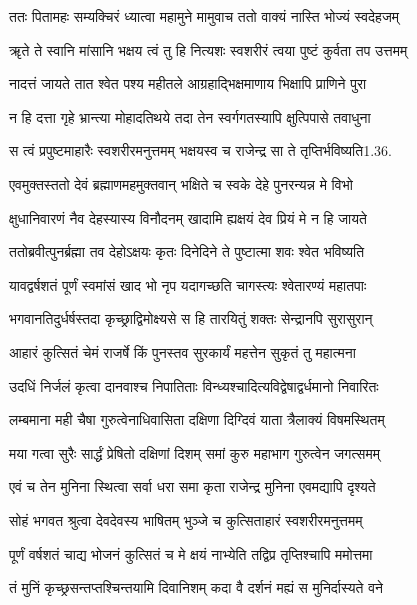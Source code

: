 \twolineshloka
{ततः पितामहः सम्यक्चिरं ध्यात्वा महामुने}
{मामुवाच ततो वाक्यं नास्ति भोज्यं स्वदेहजम्}%

\twolineshloka
{ॠते ते स्वानि मांसानि भक्षय त्वं तु हि नित्यशः}
{स्वशरीरं त्वया पुष्टं कुर्वता तप उत्तमम्}%

\twolineshloka
{नादत्तं जायते तात श्वेत पश्य महीतले}
{आग्रहाद्भिक्षमाणाय भिक्षापि प्राणिने पुरा}%

\twolineshloka
{न हि दत्ता गृहे भ्रान्त्या मोहादतिथये तदा}
{तेन स्वर्गगतस्यापि क्षुत्पिपासे तवाधुना}%

\twolineshloka
{स त्वं प्रपुष्टमाहारैः स्वशरीरमनुत्तमम्}
{भक्षयस्व च राजेन्द्र सा ते तृप्तिर्भविष्यति1.36.}%

\twolineshloka
{एवमुक्तस्ततो देवं ब्रह्माणमहमुक्तवान्}
{भक्षिते च स्वके देहे पुनरन्यन्न मे विभो}%

\twolineshloka
{क्षुधानिवारणं नैव देहस्यास्य विनौदनम्}
{खादामि ह्यक्षयं देव प्रियं मे न हि जायते}%

\twolineshloka
{ततोब्रवीत्पुनर्ब्रह्मा तव देहोऽक्षयः कृतः}
{दिनेदिने ते पुष्टात्मा शवः श्वेत भविष्यति}%

\twolineshloka
{यावद्वर्षशतं पूर्णं स्वमांसं खाद भो नृप}
{यदागच्छति चागस्त्यः श्वेतारण्यं महातपाः}%

\twolineshloka
{भगवानतिदुर्धर्षस्तदा कृच्छ्राद्विमोक्ष्यसे}
{स हि तारयितुं शक्तः सेन्द्रानपि सुरासुरान्}%

\twolineshloka
{आहारं कुत्सितं चेमं राजर्षे किं पुनस्तव}
{सुरकार्यं महत्तेन सुकृतं तु महात्मना}%

\twolineshloka
{उदधिं निर्जलं कृत्वा दानवाश्च निपातिताः}
{विन्ध्यश्चादित्यविद्वेषाद्वर्धमानो निवारितः}%

\twolineshloka
{लम्बमाना मही चैषा गुरुत्वेनाधिवासिता}
{दक्षिणा दिग्दिवं याता त्रैलाक्यं विषमस्थितम्}%

\twolineshloka
{मया गत्वा सुरैः सार्द्धं प्रेषितो दक्षिणां दिशम्}
{समां कुरु महाभाग गुरुत्वेन जगत्समम्}%

\twolineshloka
{एवं च तेन मुनिना स्थित्वा सर्वा धरा समा}
{कृता राजेन्द्र मुनिना एवमद्यापि दृश्यते}%

\twolineshloka
{सोहं भगवत श्रुत्वा देवदेवस्य भाषितम्}
{भुञ्जे च कुत्सिताहारं स्वशरीरमनुत्तमम्}%

\twolineshloka
{पूर्णं वर्षशतं चाद्य भोजनं कुत्सितं च मे}
{क्षयं नाभ्येति तद्विप्र तृप्तिश्चापि ममोत्तमा}%

\twolineshloka
{तं मुनिं कृच्छ्रसन्तप्तश्चिन्तयामि दिवानिशम्}
{कदा वै दर्शनं मह्यं स मुनिर्दास्यते वने}%

